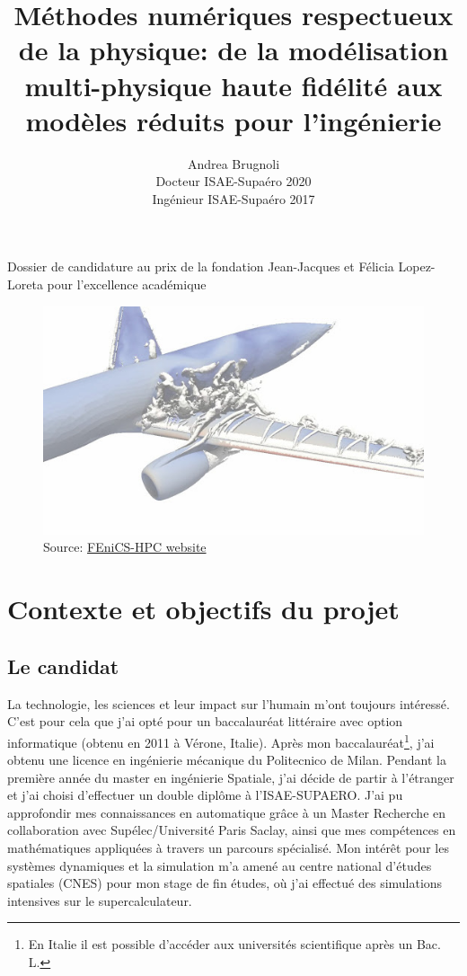 \documentclass[french]{article}
\author{Andrea Brugnoli \\ 
\hspace{2.8pt} Docteur ISAE-Supaéro 2020\\
Ingénieur ISAE-Supaéro 2017}
\title{Méthodes numériques respectueux de la physique: de la modélisation multi-physique haute fidélité aux modèles réduits pour l'ingénierie}
\date{}
\begin{document}
\maketitle

\large{Dossier de candidature au prix de la fondation Jean-Jacques et Félicia
	Lopez-Loreta pour l’excellence académique}


\begin{figure}[h]
	\centering
	\includegraphics[width=.95\textwidth]{3Dplane.jpg}
	\captionsetup{labelformat=empty}
	\caption{Source: \href{http://www.fenics-hpc.org/}{FEniCS-HPC website}}
\end{figure}





\thispagestyle{empty}

\newpage

\section{Contexte et objectifs du projet}

\subsection{Le candidat}


La technologie,  les sciences et leur impact sur l'humain m'ont toujours intéressé. C'est pour cela que j'ai opté pour un baccalauréat littéraire avec option informatique (obtenu en 2011 \`a Vérone, Italie). Après mon baccalauréat\footnote{En Italie il est possible d'accéder aux universités scientifique après un Bac. L.}, j'ai obtenu une licence en ingénierie mécanique du Politecnico de Milan. Pendant la première année du master en ingénierie Spatiale, j'ai décide de partir \`a l'étranger et j'ai choisi d'effectuer un double diplôme \`a l'ISAE-SUPAERO. J'ai pu approfondir mes connaissances en automatique grâce \`a un Master Recherche en collaboration avec Supélec/Université Paris Saclay, ainsi que mes compétences en mathématiques appliquées \`a travers un parcours spécialisé. Mon intérêt pour les systèmes dynamiques et la simulation m'a amené au centre national d'études spatiales (CNES) pour mon stage de fin études, o\`u j'ai effectué des simulations intensives sur le supercalculateur. \\
\end{document}
